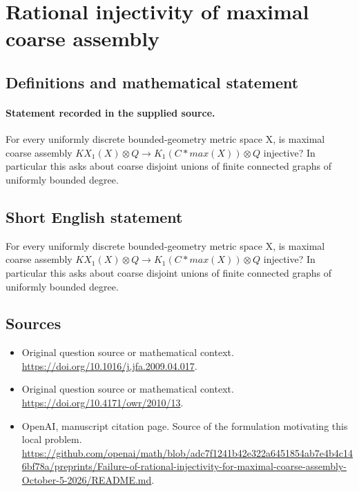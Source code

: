 \documentclass[11pt]{article}
\begin{document}
\section*{Rational injectivity of maximal coarse assembly}\label{30007505}
\subsection{Definitions and mathematical statement}
\paragraph{Statement recorded in the supplied source.}
For every uniformly discrete bounded-geometry metric space X, is maximal coarse assembly $KX_{1}(X)\otimes Q\to K_{1}(C*max(X))\otimes Q$ injective? In particular this asks about coarse disjoint unions of finite connected graphs of uniformly bounded degree.
\subsection{Short English statement}
For every uniformly discrete bounded-geometry metric space X, is maximal coarse assembly $KX_{1}(X)\otimes Q\to K_{1}(C*max(X))\otimes Q$ injective? In particular this asks about coarse disjoint unions of finite connected graphs of uniformly bounded degree.
\subsection{Sources}
\begin{itemize}
\item[S1] Original question source or mathematical context.
\url{https://doi.org/10.1016/j.jfa.2009.04.017}.
\item[S2] Original question source or mathematical context.
\url{https://doi.org/10.4171/owr/2010/13}.
\item[S3] OpenAI, manuscript citation page. Source of the formulation motivating this local problem.
\url{https://github.com/openai/math/blob/adc7f1241b42e322a6451854ab7e4b4c146bf78a/preprints/Failure-of-rational-injectivity-for-maximal-coarse-assembly-October-5-2026/README.md}.
\end{itemize}
\end{document}
